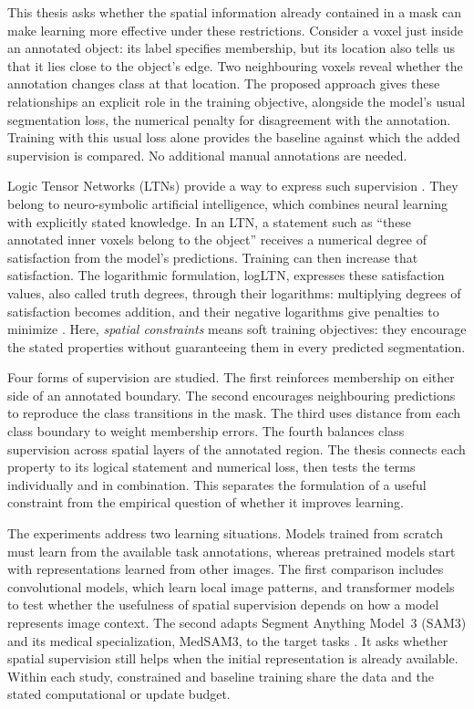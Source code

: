\documentclass[12pt,a4paper]{article}
\begin{document}
This thesis asks whether the spatial information already contained in a mask
can make learning more effective under these restrictions. Consider a voxel
just inside an annotated object: its label specifies membership, but its
location also tells us that it lies close to the object's edge. Two
neighbouring voxels reveal whether the annotation changes class at that
location. The proposed approach gives these relationships an explicit role
in the training objective, alongside the model's usual segmentation loss,
the numerical penalty for disagreement with the annotation. Training with
this usual loss alone provides the baseline against which the added
supervision is compared. No additional manual annotations are needed.

Logic Tensor Networks (LTNs) provide a way to express such supervision
\cite{badreddine2022logic}. They belong to neuro-symbolic artificial
intelligence, which combines neural learning with explicitly stated
knowledge. In an LTN, a statement such as ``these annotated inner voxels
belong to the object'' receives a numerical degree of satisfaction from the
model's predictions. Training can then increase that satisfaction. The
logarithmic formulation, logLTN, expresses these satisfaction values, also
called truth degrees, through their logarithms: multiplying degrees of
satisfaction becomes addition, and their negative logarithms give penalties
to minimize \cite{badreddine2023logltn}. Here, \emph{spatial constraints}
means soft training objectives: they encourage the stated properties without
guaranteeing them in every predicted segmentation.

Four forms of supervision are studied. The first reinforces membership
on either side of an annotated boundary. The second encourages
neighbouring predictions to reproduce the class transitions in the mask.
The third uses distance from each class boundary to weight membership
errors. The fourth balances class supervision across spatial layers of
the annotated region. The thesis connects each property to its logical
statement and numerical loss, then tests the terms individually and in
combination. This separates the formulation of a useful constraint from
the empirical question of whether it improves learning.

The experiments address two learning situations. Models trained from scratch
must learn from the available task annotations, whereas pretrained models
start with representations learned from other images. The first comparison
includes convolutional models, which learn local image patterns, and
transformer models to test whether the usefulness of spatial supervision
depends on how a model represents image context. The second adapts Segment
Anything Model~3 (SAM3) and its medical specialization, MedSAM3, to the
target tasks \cite{carion2025sam3,liu2025medsam3}. It asks whether spatial
supervision still helps when the initial representation is already
available. Within each study, constrained and baseline training share the
data and the stated computational or update budget.
\end{document}
